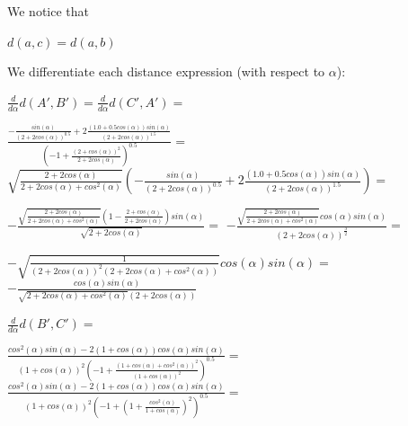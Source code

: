 \documentclass[a4paper,10pt]{article}
\begin{document}
\noindent
We notice that
\begin {center}
$ d\left(a, c\right)=d\left(a, b\right) $
\end {center}



\noindent
We differentiate each distance expression (with respect to $\alpha$):




\noindent$\frac{d}{d\alpha}d\left(A', B'\right)=\frac{d}{d\alpha}d\left(C', A'\right)=$

$\frac{- \frac{sin\left(\alpha\right)}{\left(2 + 2 cos\left(\alpha\right)\right)^{0.5}} + 2 \frac{\left(1.0 + 0.5 cos\left(\alpha\right)\right) sin\left(\alpha\right)}{\left(2 + 2 cos\left(\alpha\right)\right)^{1.5}}}{\left(-1 + \frac{\left(2 + cos\left(\alpha\right)\right)^{2}}{2 + 2 cos\left(\alpha\right)}\right)^{0.5}}=$
$\sqrt{\frac{2 + 2 cos\left(\alpha\right)}{2 + 2 cos\left(\alpha\right) + cos^{2}\left(\alpha\right)}} \left(- \frac{sin\left(\alpha\right)}{\left(2 + 2 cos\left(\alpha\right)\right)^{0.5}} + 2 \frac{\left(1.0 + 0.5 cos\left(\alpha\right)\right) sin\left(\alpha\right)}{\left(2 + 2 cos\left(\alpha\right)\right)^{1.5}}\right)=$

$- \frac{\sqrt{\frac{2 + 2 cos\left(\alpha\right)}{2 + 2 cos\left(\alpha\right) + cos^{2}\left(\alpha\right)}} \left(1 - \frac{2 + cos\left(\alpha\right)}{2 + 2 cos\left(\alpha\right)}\right) sin\left(\alpha\right)}{\sqrt{2 + 2 cos\left(\alpha\right)}}=$
$- \frac{\sqrt{\frac{2 + 2 cos\left(\alpha\right)}{2 + 2 cos\left(\alpha\right) + cos^{2}\left(\alpha\right)}} cos\left(\alpha\right) sin\left(\alpha\right)}{\left(2 + 2 cos\left(\alpha\right)\right)^{\frac{3}{2}}}=$

$- \sqrt{\frac{1}{\left(2 + 2 cos\left(\alpha\right)\right)^{2} \left(2 + 2 cos\left(\alpha\right) + cos^{2}\left(\alpha\right)\right)}} cos\left(\alpha\right) sin\left(\alpha\right)=$
$- \frac{cos\left(\alpha\right) sin\left(\alpha\right)}{\sqrt{2 + 2 cos\left(\alpha\right) + cos^{2}\left(\alpha\right)} \left(2 + 2 cos\left(\alpha\right)\right)}$


\noindent$\frac{d}{d\alpha}d\left(B',C'\right)=$

$\frac{cos^{2}\left(\alpha\right) sin\left(\alpha\right) - 2 \left(1 + cos\left(\alpha\right)\right) cos\left(\alpha\right) sin\left(\alpha\right)}{\left(1 + cos\left(\alpha\right)\right)^{2} \left(-1 + \frac{\left(1 + cos\left(\alpha\right) + cos^{2}\left(\alpha\right)\right)^{2}}{\left(1 + cos\left(\alpha\right)\right)^{2}}\right)^{0.5}}=$
$\frac{cos^{2}\left(\alpha\right) sin\left(\alpha\right) - 2 \left(1 + cos\left(\alpha\right)\right) cos\left(\alpha\right) sin\left(\alpha\right)}{\left(1 + cos\left(\alpha\right)\right)^{2} \left(-1 + \left(1 + \frac{cos^{2}\left(\alpha\right)}{1 + cos\left(\alpha\right)}\right)^{2}\right)^{0.5}}=$
\end{document}

